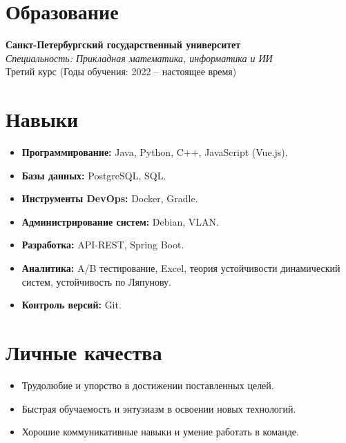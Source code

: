 \documentclass[a4paper,10pt]{article}
\begin{document}
\vspace{0.5cm}

\section*{Образование}

\textbf{Санкт-Петербургский государственный университет} \\
\textit{Специальность: Прикладная математика, информатика и ИИ} \\
Третий курс (Годы обучения: 2022 – настоящее время)

\vspace{0.5cm}

\section*{Навыки}

\begin{itemize}
    \item \textbf{Программирование:} Java, Python, C++, JavaScript (Vue.js).
    \item \textbf{Базы данных:} PostgreSQL, SQL.
    \item \textbf{Инструменты DevOps:} Docker, Gradle.
    \item \textbf{Администрирование систем:} Debian, VLAN.
    \item \textbf{Разработка:} API-REST, Spring Boot.
    \item \textbf{Аналитика:} A/B тестирование, Excel, теория устойчивости динамический систем, устойчивость по Ляпунову.
    \item \textbf{Контроль версий:} Git.
\end{itemize}

\vspace{0.5cm}

\section*{Личные качества}

\begin{itemize}
    \item Трудолюбие и упорство в достижении поставленных целей.
    \item Быстрая обучаемость и энтузиазм в освоении новых технологий.
    \item Хорошие коммуникативные навыки и умение работать в команде.
\end{itemize}
\end{document}

